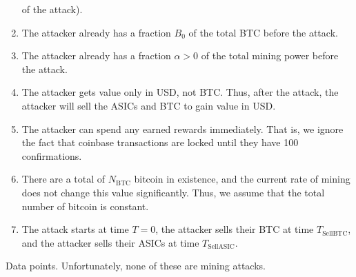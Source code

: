 \documentclass[12pt]{article}
\newcommand*{\Time}{T}
\newcommand*{\ABtcOrig}{{B_0}}
\newcommand*{\NumBtc}{{N_{\mathrm{BTC}}}}
\newcommand*{\TimeCashOut}{{T_{\mathrm{SellBTC}}}}
\newcommand*{\TimeSellAsics}{{T_{\mathrm{SellASIC}}}}
\begin{document}
\begin{enumerate}
    of the attack).
  \item
    The attacker already has a fraction $\ABtcOrig$ of the total BTC
    before the attack.
  \item
    The attacker already has a fraction $\alpha > 0$ of the total mining power
    before the attack.
  \item
    The attacker gets value only in USD, not BTC. Thus, after the attack, the
    attacker will sell the ASICs and BTC to gain value in USD.
  \item
    The attacker can spend any earned rewards immediately. That is, we ignore
    the fact that coinbase transactions are locked until they have 100
    confirmations.
  \item
    There are a total of $\NumBtc$ bitcoin in existence, and the current rate
    of mining does not change this value significantly. Thus, we assume that
    the total number of bitcoin is constant.
  \item
    The attack starts at time $\Time = 0$, the attacker sells their BTC at time $\TimeCashOut$, and the attacker sells their ASICs at time $\TimeSellAsics$.
\end{enumerate}

Data points. Unfortunately, none of these are mining attacks.
\end{document}

